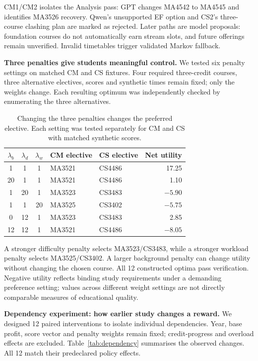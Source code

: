 \documentclass{article}
\begin{document}
CM1/CM2 isolates the Analysis pass: GPT changes MA4542 to MA4545 and identifies MA3526 recovery. Qwen's unsupported EF option and CS2's three-course clashing plan are marked as rejected. Later paths are model proposals: foundation courses do not automatically earn stream slots, and future offerings remain unverified. Invalid timetables trigger validated Markov fallback.

\newpage
\textbf{Three penalties give students meaningful control.} We tested six penalty settings on matched CM and CS fixtures. Four required three-credit courses, three alternative electives, scores and synthetic times remain fixed; only the weights change. Each resulting optimum was independently checked by enumerating the three alternatives.

\begin{table}[H]
\centering\small
\caption{Changing the three penalties changes the preferred elective. Each setting was tested separately for CM and CS with matched synthetic scores.}
\begin{tabular}{cccp{1.05in}p{1.05in}r}
\toprule
$\lambda_b$ & $\lambda_d$ & $\lambda_w$ & CM elective & CS elective & Net utility\\
\midrule
1 & 1 & 1 & MA3521 & CS4486 & 17.25\\
20 & 1 & 1 & MA3521 & CS4486 & 1.10\\
1 & 20 & 1 & MA3523 & CS3483 & $-5.90$\\
1 & 1 & 20 & MA3525 & CS3402 & $-5.75$\\
0 & 12 & 1 & MA3523 & CS3483 & 2.85\\
12 & 12 & 1 & MA3521 & CS4486 & $-8.05$\\
\bottomrule
\end{tabular}
\label{tab:lambda}
\end{table}

A stronger difficulty penalty selects MA3523/CS3483, while a stronger workload penalty selects MA3525/CS3402. A larger background penalty can change utility without changing the chosen course. All 12 constructed optima pass verification. Negative utility reflects binding study requirements under a demanding preference setting; values across different weight settings are not directly comparable measures of educational quality.

\textbf{Dependency experiment: how earlier study changes a reward.} We designed 12 paired interventions to isolate individual dependencies. Year, base profit, score vector and penalty weights remain fixed; credit-progress and overload effects are excluded. Table~\ref{tab:dependency} summarises the observed changes. All 12 match their predeclared policy effects.
\end{document}
